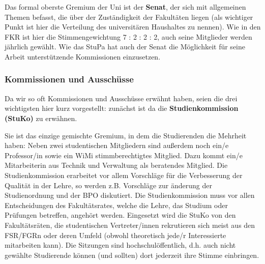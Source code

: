 Das formal oberste Gremium der Uni ist der \textbf{Senat}, der sich mit 
allgemeinen Themen befasst, die über der Zuständigkeit der Fakultäten 
liegen (als wichtiger Punkt ist hier die Verteilung des universitären 
Haushaltes zu nennen). Wie in den FKR ist hier die Stimmengewichtung 7 : 2 : 2 
: 2, auch seine Mitglieder werden jährlich gewählt. Wie das StuPa hat auch der 
Senat die Möglichkeit für seine Arbeit unterstützende Kommissionen einzusetzen.

\subsubsection*{Kommissionen und Ausschüsse}

Da wir so oft Kommissionen und Ausschüsse erwähnt haben, seien die drei 
wichtigsten hier kurz vorgestellt: zunächst ist da die 
\textbf{Studienkommission (StuKo)} zu erwähnen.

Sie ist das einzige gemischte Gremium, in dem die Studierenden die Mehrheit 
haben: Neben zwei studentischen Mitgliedern sind außerdem noch ein/e Professor/in sowie ein WiMi stimmberechtigtes Mitglied. 
Dazu kommt ein/e Mitarbeiterin aus Technik und Verwaltung als beratendes Mitglied.
Die Studienkommission erarbeitet vor allem Vorschläge für die Verbesserung der 
Qualität in der Lehre, so werden z.B. Vorschläge zur änderung der 
Studienordnung und der BPO diskutiert. Die Studienkommission muss vor allen 
Entscheidungen des Fakultätsrates, welche die Lehre, das Studium oder 
Prüfungen betreffen, angehört werden. Eingesetzt wird die StuKo von den 
Fakultätsräten, die studentischen Vertreter/innen rekrutieren sich meist aus den 
FSR/FGRn oder deren Umfeld (obwohl theoretisch jede/r Interessierte mitarbeiten 
kann). Die Sitzungen sind hochschulöffentlich, d.h. auch nicht gewählte 
Studierende können (und sollten) dort jederzeit ihre Stimme einbringen.

